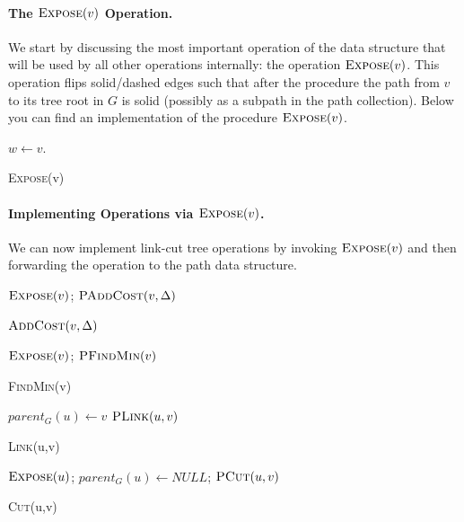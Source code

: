\paragraph{The $\textsc{Expose}(v)$ Operation.} We start by discussing the most important operation of the data structure that will be used by all other operations internally: the operation $\textsc{Expose}(v)$. This operation flips solid/dashed edges such that after the procedure the path from $v$ to its tree root in $G$ is solid (possibly as a subpath in the path collection). Below you can find an implementation of the procedure $\textsc{Expose}(v)$. 

\begin{algorithm}
  \SetAlgoLined
  $w \gets v$.\\
  \caption{\textsc{Expose}(v)}
\end{algorithm}

\paragraph{Implementing Operations via $\textsc{Expose}(v)$.} We can now implement link-cut tree operations by invoking $\textsc{Expose}(v)$ and then forwarding the operation to the path data structure. 
\begin{algorithm}[H]
  \SetAlgoLined
  $\textsc{Expose}(v)$; $\textsc{PAddCost}(v, \Delta)$
  \caption{$\textsc{AddCost}(v, \Delta)$}
\end{algorithm}
\begin{algorithm}[H]
  \SetAlgoLined
  $\textsc{Expose}(v)$; \Return $\textsc{PFindMin}(v)$
  \caption{\textsc{FindMin}(v)}
\end{algorithm}
\begin{algorithm}[H]
  \SetAlgoLined
  $parent_G(u) \gets v$\;
  $\textsc{PLink}(u,v)$
  \caption{\textsc{Link}(u,v)}
\end{algorithm}
\begin{algorithm}[H]
  \SetAlgoLined
  $\textsc{Expose}(u)$; $parent_G(u) \gets NULL$; $\textsc{PCut}(u,v)$\;
  \caption{\textsc{Cut}(u,v)}
\end{algorithm}


